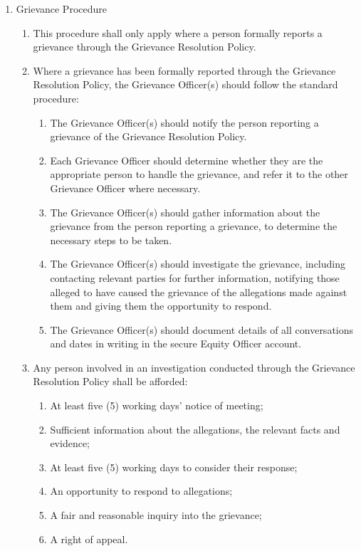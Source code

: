 \begin{enumerate}
\item Grievance Procedure
  \begin{enumerate}
  \item This procedure shall only apply where a person formally reports a grievance through the Grievance Resolution Policy.
  \item Where a grievance has been formally reported through the Grievance Resolution Policy, the Grievance Officer(s) should follow the standard procedure:
    \begin{enumerate}
    \item The Grievance Officer(s) should notify the person reporting a grievance of the Grievance Resolution Policy.
    \item Each Grievance Officer should determine whether they are the appropriate person to handle the grievance, and refer it to the other Grievance Officer where necessary.
    \item The Grievance Officer(s) should gather information about the grievance from the person reporting a grievance, to determine the necessary steps to be taken.
    \item The Grievance Officer(s) should investigate the grievance, including contacting relevant parties for further information, notifying those alleged to have caused the grievance of the allegations made against them and giving them the opportunity to respond.
    \item The Grievance Officer(s) should document details of all conversations and dates in writing in the secure Equity Officer account.
    \end{enumerate}
  \item Any person involved in an investigation conducted through the Grievance Resolution Policy shall be afforded:
    \begin{enumerate}
    \item At least five (5) working days’ notice of meeting;
    \item Sufficient information about the allegations, the relevant facts and evidence;
    \item At least five (5) working days to consider their response;
    \item An opportunity to respond to allegations;
    \item A fair and reasonable inquiry into the grievance;
    \item A right of appeal.
    \end{enumerate}
  \end{enumerate}


\end{enumerate}
